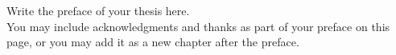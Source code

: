
Write the preface of your thesis here. \\

\noindent You may include acknowledgments and thanks as part of your preface on this page, or you may add it as a new chapter after the preface.